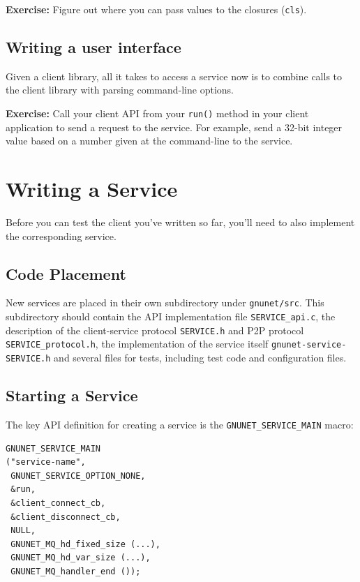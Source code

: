 \documentclass[10pt]{article}
\newcommand{\exercise}[1]{\noindent\begin{boxedminipage}{\textwidth}{\bf Exercise:} #1 \end{boxedminipage}}
\begin{document}
\exercise{Figure out where you can pass values to the closures ({\tt cls}).}


\subsection{Writing a user interface}

Given a client library, all it takes to access a service now is to
combine calls to the client library with parsing command-line
options.

\exercise{Call your client API from your {\tt run()} method in your
  client application to send a request to the service.  For example,
  send a 32-bit integer value based on a number given at the
  command-line to the service.}



\section{Writing a Service}

Before you can test the client you've written so far, you'll need to also
implement the corresponding service.


\subsection{Code Placement}

New services are placed in their own subdirectory under {\tt gnunet/src}.
This subdirectory should contain the API implementation file {\tt SERVICE\_api.c},
the description of the client-service protocol {\tt SERVICE.h} and P2P protocol
{\tt SERVICE\_protocol.h}, the implementation of the service itself
{\tt gnunet-service-SERVICE.h} and several files for tests, including test code
and configuration files.

\subsection{Starting a Service}

The key API definition for creating a service is the {\tt GNUNET\_SERVICE\_MAIN} macro:
\lstset{language=C}
\begin{lstlisting}
GNUNET_SERVICE_MAIN
("service-name",
 GNUNET_SERVICE_OPTION_NONE,
 &run,
 &client_connect_cb,
 &client_disconnect_cb,
 NULL,
 GNUNET_MQ_hd_fixed_size (...),
 GNUNET_MQ_hd_var_size (...),
 GNUNET_MQ_handler_end ());
\end{lstlisting}
\end{document}
